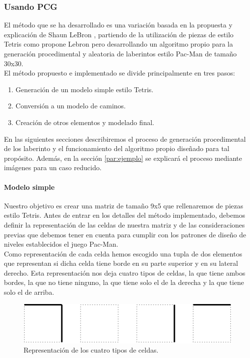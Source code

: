 \subsubsection{Usando PCG}

El método que se ha desarrollado es una variación basada en la propuesta y explicación de Shaun LeBron \cite{lebron2012}, partiendo de la utilización de piezas de estilo Tetris como propone Lebron pero desarrollando un algoritmo propio para la generación procedimental y aleatoria de laberintos estilo Pac-Man de tamaño 30x30.\\

El método propuesto e implementado se divide principalmente en tres pasos:

\begin{enumerate}
    \item Generación de un modelo simple estilo Tetris.
    \item Conversión a un modelo de caminos.
    \item Creación de otros elementos y modelado final.
\end{enumerate}

En las siguientes secciones describiremos el proceso de generación procedimental de los laberinto y el funcionamiento del algoritmo propio diseñado para tal propósito. Además, en la sección \ref{par:ejemplo} se explicará el proceso mediante imágenes para un caso reducido.

\paragraph{Modelo simple}
Nuestro objetivo es crear una matriz de tamaño 9x5 que rellenaremos de piezas estilo Tetris. Antes de entrar en los detalles del método implementado, debemos definir la representación de las celdas de nuestra matriz y de las consideraciones previas que debemos tener en cuenta para cumplir con los patrones de diseño de niveles establecidos el juego Pac-Man.\\

Como representación de cada celda hemos escogido una tupla de dos elementos que representan si dicha celda tiene borde en su parte superior y en su lateral derecho. Esta representación nos deja cuatro tipos de celdas, la que tiene ambos bordes, la que no tiene ninguno, la que tiene solo el de la derecha y la que tiene solo el de arriba.\\

\begin{figure}[H]
    \begin{center}
        \includegraphics[scale=0.55]{img/celdas.png}
        \caption{Representación de los cuatro tipos de celdas.}
    \end{center}
\end{figure}

